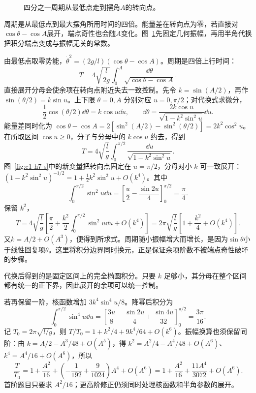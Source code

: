 \begin{figure}[H]\centering
{}
\caption{四分之一周期从最低点走到摆角$A$的转向点。}\label{fig:c1-h7-q}
\end{figure}
\begin{solution}
周期是从最低点到最大摆角所用时间的四倍。能量差在转向点为零，若直接对$\cos\theta-\cos A$展开，端点奇性也会随$A$变化。图~\ref{fig:c1-h7-q}先固定几何振幅，再用半角代换把积分端点变成与振幅无关的常数。


由最低点取零势能，$\dot\theta^2=(2g/l)(\cos\theta-\cos A)$。周期是四倍上行时间：
\[T=4\sqrt{\frac l{2g}}\int_0^A\frac{\dd\theta}{\sqrt{\cos\theta-\cos A}}.
\]
直接展开分母会使余项在转向点附近失去一致控制。先令 $k=\sin(A/2)$，再作 $\sin(\theta/2)=k\sin u$。上下限 $\theta=0,A$ 分别对应 $u=0,\pi/2$；对代换式求微分，
\[
\frac12\cos(\theta/2)\dd\theta=k\cos u\dd u,\qquad
\dd\theta=\frac{2k\cos u}{\sqrt{1-k^2\sin^2u}}\dd u.
\]
能量差同时化为 $\cos\theta-\cos A=2[\sin^2(A/2)-\sin^2(\theta/2)]=2k^2\cos^2u$。在所取区间 $\cos u\ge0$，分子与分母中的 $k\cos u$ 约去，得到
\[T=4\sqrt{\frac lg}\int_0^{\pi/2}\frac{\dd u}{\sqrt{1-k^2\sin^2u}}.
\]
图~\ref{fig:c1-h7-s}中的新变量把转向点固定在 $u=\pi/2$，分母对小 $k$ 可一致展开：$(1-k^2\sin^2u)^{-1/2}=1+\tfrac12k^2\sin^2u+O(k^4)$。其中
\[
\int_0^{\pi/2}\sin^2u\dd u
=\left[\frac u2-\frac{\sin2u}{4}\right]_0^{\pi/2}=\frac\pi4.
\]
保留 $k^2$，
\[T=4\sqrt{\frac lg}\left[\frac\pi2+\frac{k^2}{2}\int_0^{\pi/2}\sin^2u\dd u+O(k^4)\right]
=2\pi\sqrt{\frac lg}\left[1+\frac{k^2}{4}+O(k^4)\right].
\]
又$k=A/2+O(A^3)$，便得到所求式。周期随小振幅增大而增长，是因为$\sin\theta$小于线性回复项$\theta$。这里将积分边界同时换元，正是保证余项阶数不被端点奇性破坏的步骤。


代换后得到的是固定区间上的完全椭圆积分。只要 $k$ 足够小，其分母在整个区间都有统一的正下界，因此展开的余项可以统一控制。

若再保留一阶，核函数增加 $3k^4\sin^4u/8$。降幂后积分为
\[
\int_0^{\pi/2}\sin^4u\dd u
=\left[\frac{3u}{8}-\frac{\sin2u}{4}+\frac{\sin4u}{32}\right]_0^{\pi/2}
=\frac{3\pi}{16}.
\]
记 $T_0=2\pi\sqrt{l/g}$，则 $T/T_0=1+k^2/4+9k^4/64+O(k^6)$。振幅换算也须保留同阶：由 $k=A/2-A^3/48+O(A^5)$，得 $k^2=A^2/4-A^4/48+O(A^6)$、$k^4=A^4/16+O(A^6)$，所以
\[
\frac{T}{T_0}=1+\frac{A^2}{16}
+\left(-\frac1{192}+\frac9{1024}\right)A^4+O(A^6)
=1+\frac{A^2}{16}+\frac{11A^4}{3072}+O(A^6).
\]
首阶题目只要求 $A^2/16$；更高阶修正仍须同时处理核函数和半角参数的展开。


\end{solution}
